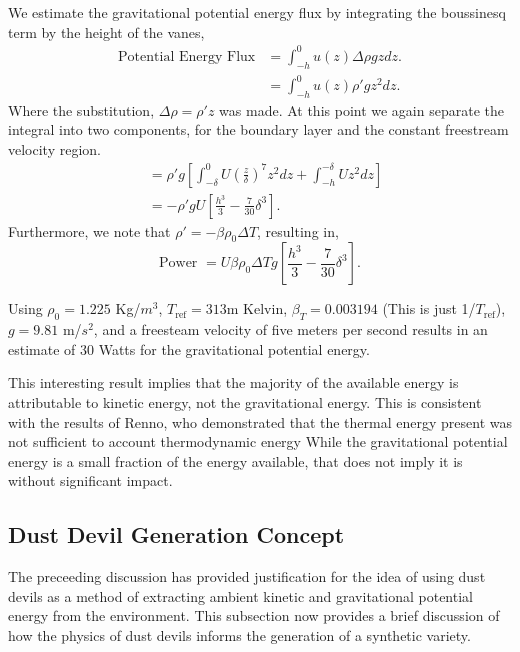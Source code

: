 We estimate the gravitational potential
energy flux by integrating the boussinesq term by the height of the vanes, 
\begin{align*}
  \text{Potential Energy Flux} & = \int_{-h}^0 u(z) \Delta \rho g z dz. \\
  & = \int_{-h}^0 u(z) \rho' g z^2 dz. 
\end{align*}
Where the substitution, $\Delta \rho = \rho' z$ was made. At 
this point we again separate the integral into two components, 
for the boundary layer and the constant freestream velocity region. 
\begin{align*}
  & = \rho' g \left[ \int_{-\delta}^{0} U \left( \frac{z}{\delta} \right)^7 z^2 dz 
      + \int_{-h}^{-\delta} U z^2 dz \right] \\
  & = -\rho' g U \left[ \frac{h^3}{3} - \frac{7}{30} \delta^3 \right].
\end{align*}
Furthermore, we
note that $\rho' = -\beta \rho_0 \Delta T$, resulting in, 
%
%
\begin{equation}
 \text{Power } = U \beta \rho_0 \Delta T g \left[ \frac{h^3}{3} -
					    \frac{7}{30} \delta^3
					   \right]. 
\end{equation}

Using $\rho_0 = 1.225$ Kg/$m^3$, $T_{\text{ref}}=313$m Kelvin, $\beta_T = 0.003194$
(This is just 1/$T_{\text{ref}}$), $g=9.81$ m/$s^2$, and a freesteam
velocity of five meters per second results in an
estimate of 30 Watts for the gravitational potential energy. 

This interesting result implies that the majority of the available
energy is attributable to kinetic energy, not the gravitational
energy. This is consistent with the results of Renno, who demonstrated
that the thermal energy present was not sufficient to account 
thermodynamic energy 
%
%
While the gravitational potential energy is a small fraction of the
energy available, that does not imply it is without significant impact. 

\subsection{Dust Devil Generation Concept}

The preceeding discussion has provided justification for the idea of
using dust devils as a method of extracting ambient kinetic and
gravitational potential energy from the environment. This  
subsection now provides a brief discussion of how the physics of 
dust devils informs the generation of a synthetic variety. 

